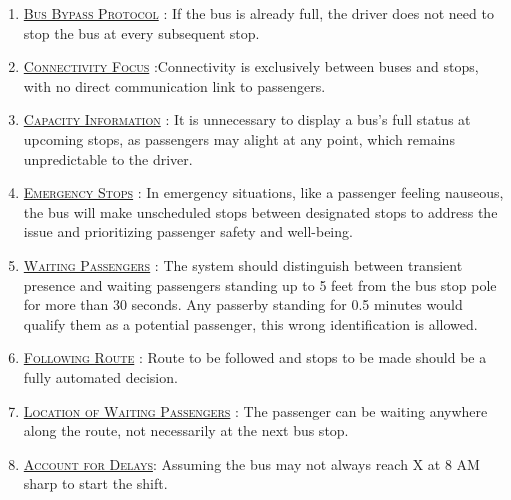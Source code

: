 \begin{enumerate}
    \item \underline{\textsc{Bus Bypass Protocol}} : If the bus is already full, the driver does not need to stop the bus at every subsequent stop.

    \item \underline{\textsc{Connectivity Focus}} :Connectivity is exclusively between buses and stops, with no direct communication link to passengers.

    \item \underline{\textsc{Capacity Information}} : It is unnecessary to display a bus's full status at upcoming stops, as passengers may alight at any point, which remains unpredictable to the driver.

    \item \underline{\textsc{Emergency Stops}} : In emergency situations, like a passenger feeling nauseous, the bus will make unscheduled stops between designated stops to address the issue and prioritizing passenger safety and well-being.

    \item \underline{\textsc{Waiting Passengers}} : The system should distinguish between transient presence and waiting passengers standing up to 5 feet from the bus stop pole for more than 30 seconds. Any passerby standing for 0.5 minutes would qualify them as a potential passenger, this wrong identification is allowed.

    \item \underline{\textsc{Following Route}} : Route to be followed and stops to be made should be a fully automated decision.

    \item \underline{\textsc{Location of Waiting Passengers}} : The passenger can be waiting anywhere along the route, not necessarily at the next bus stop.

    \item \underline{\textsc{Account for Delays}}: Assuming the bus may not always reach X at 8 AM sharp to start the shift.
\end{enumerate}



